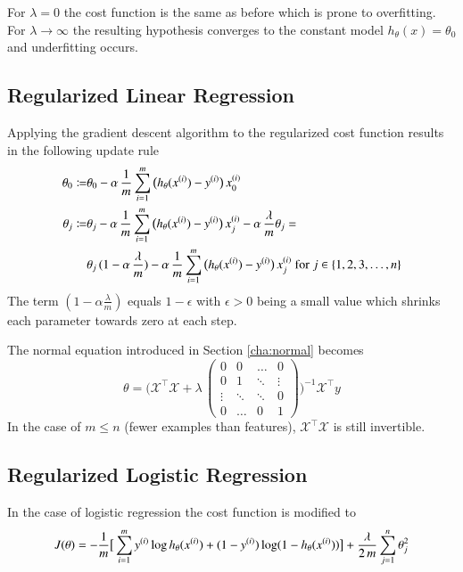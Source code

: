 \documentclass[a4paper,twoside,10pt]{article}
\begin{document}
For $\lambda=0$ the cost function is the same as before which is prone to overfitting. For $\lambda\rightarrow\infty$ the resulting hypothesis converges to the constant model $h_\theta(x)=\theta_0$ and underfitting occurs.

\subsection{Regularized Linear Regression}
Applying the gradient descent algorithm to the regularized cost function results in the following update rule
\begin{align*}
  \begin{split}
    \theta_0\coloneqq&\theta_0-\alpha\,\frac{1}{m}\displaystyle\sum_{i=1}^m\big(h_\theta(x^{(i)})-y^{(i)}\big)\,x^{(i)}_0\\
    \theta_j\coloneqq&\theta_j-\alpha\,\frac{1}{m}\displaystyle\sum_{i=1}^m\big(h_\theta(x^{(i)})-y^{(i)}\big)\,x^{(i)}_j-\alpha\,\frac{\lambda}{m}\theta_j=\\
    &\theta_j\,(1-\alpha\,\frac{\lambda}{m})-\alpha\,\frac{1}{m}\displaystyle\sum_{i=1}^m\big(h_\theta(x^{(i)})-y^{(i)}\big)\,x^{(i)}_j
    \mathrm{\ for\ }j\in\{1,2,3,\ldots,n\}
  \end{split}
\end{align*}
The term $(1-\alpha\frac{\lambda}{m})$ equals $1-\epsilon$ with $\epsilon>0$ being a small value which shrinks each parameter towards zero at each step.

The normal equation introduced in Section \ref{cha:normal} becomes
\begin{equation*}
  \theta=\Bigg(\mathcal{X}^\top\mathcal{X}+\lambda\,
\begin{pmatrix}
  0&0&\hdots&0\\
  0&1&\ddots&\vdots\\
  \vdots&\ddots&\ddots&0\\
  0&\hdots&0&1
\end{pmatrix}\Bigg)^{-1}\mathcal{X}^\top y
\end{equation*}
In the case of $m\le n$ (fewer examples than features), $\mathcal{X}^\top\mathcal{X}$ is still invertible.

\subsection{Regularized Logistic Regression}
In the case of logistic regression the cost function is modified to
\begin{equation*}
  J(\theta)=-\frac{1}{m}\big[\displaystyle\sum_{i=1}^my^{(i)}\operatorname{log}h_\theta(x^{(i)})+(1-y^{(i)})\operatorname{log}(1-h_\theta(x^{(i)}))\big]+
  \frac{\lambda}{2\,m}\sum_{j=1}^n\theta_j^2
\end{equation*}
\end{document}
